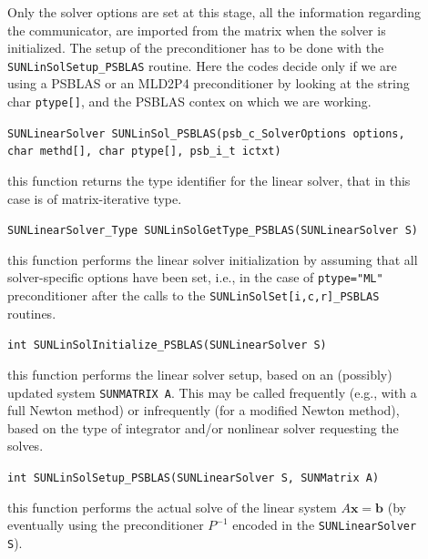 \documentclass[twoside,a4paper]{refart}
\theoremstyle{definition}
\begin{document}
\begin{description}

\item[] Only the solver options are set at this stage, all the information regarding the communicator, are imported from the matrix when the solver is initialized. The setup of the preconditioner has to be done with the \lstinline[style=CStyle]|SUNLinSolSetup_PSBLAS| routine. Here the codes decide only if we are using a PSBLAS or an MLD2P4 preconditioner by looking at the string char \lstinline[style=CStyle]|ptype[]|, and the PSBLAS contex on which we are working.
	
 \lstinline[style=CStyle]|SUNLinearSolver SUNLinSol_PSBLAS(psb_c_SolverOptions options, char methd[], char ptype[], psb_i_t ictxt)|

\item[] this function returns the type identifier for the linear solver, that in this case is of matrix-iterative type.

 \lstinline[style=CStyle]|SUNLinearSolver_Type SUNLinSolGetType_PSBLAS(SUNLinearSolver S)|

\item[] this function performs the linear solver initialization by assuming that all solver-specific options have been set, i.e., in the case of \lstinline[style=CStyle]|ptype="ML"| preconditioner after the calls to the \texttt{SUNLinSolSet[i,c,r]\_PSBLAS} routines.

 \lstinline[style=CStyle]|int SUNLinSolInitialize_PSBLAS(SUNLinearSolver S)|

\item[] this function performs the linear solver setup, based on an (possibly) updated system \lstinline[style=CStyle]|SUNMATRIX A|. This may be called frequently (e.g., with a full
Newton method) or infrequently (for a modified Newton method), based on the type of
integrator and/or nonlinear solver requesting the solves.

 \lstinline[style=CStyle]|int SUNLinSolSetup_PSBLAS(SUNLinearSolver S, SUNMatrix A)|

\item[] this function performs the actual solve of the linear system $A\mathbf{x} = \mathbf{b}$ (by eventually using the preconditioner $P^{-1}$ encoded in the \lstinline[style=CStyle]|SUNLinearSolver S|).


\end{description}
\end{document}
